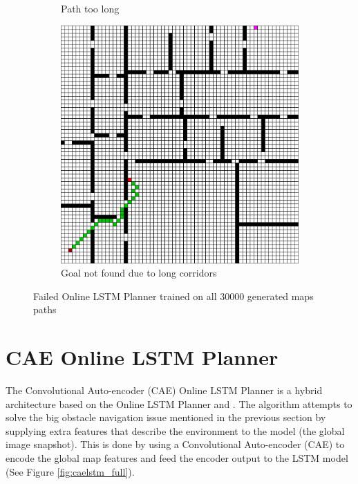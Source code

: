 \begin{figure}[h!]
\begin{subfigure}[b]{0.33\linewidth}
     \caption{Path too long \newline}
  \end{subfigure}
  \hfill
  \begin{subfigure}[b]{0.33\linewidth}
    \includegraphics[width=\linewidth]{images/lstm_4_all.png}
     \caption{Goal not found due to long corridors}
  \end{subfigure}
  \caption{Failed Online LSTM Planner 
  trained on all 30000 generated maps paths}
  \label{fig: lstm path fail}
\end{figure}

\pagebreak

\section{CAE Online LSTM Planner}

The Convolutional Auto-encoder (CAE) Online LSTM Planner is a hybrid architecture based on the Online LSTM Planner and \cite{inoue2019robot}. The algorithm attempts to solve the big obstacle navigation issue mentioned in the previous section by supplying extra features that describe the environment to the model (the global image snapshot). This is done by using a Convolutional Auto-encoder (CAE) to encode the global map features and feed the encoder output to the LSTM model (See Figure \ref{fig:caelstm_full}).

